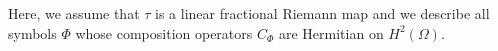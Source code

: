 \documentclass[11pt]{amsart}%
\newtheorem{lem}[thm]{Lemma}
\theoremstyle{definition}
\theoremstyle{remark}
\numberwithin{equation}{section}
\begin{document}
Here, we assume that $\tau$ is a linear fractional Riemann map and we describe all symbols $\Phi$ whose
composition operators $C_{\Phi}$ are Hermitian on $H^{2}(\Omega).$ %
\end{document}
